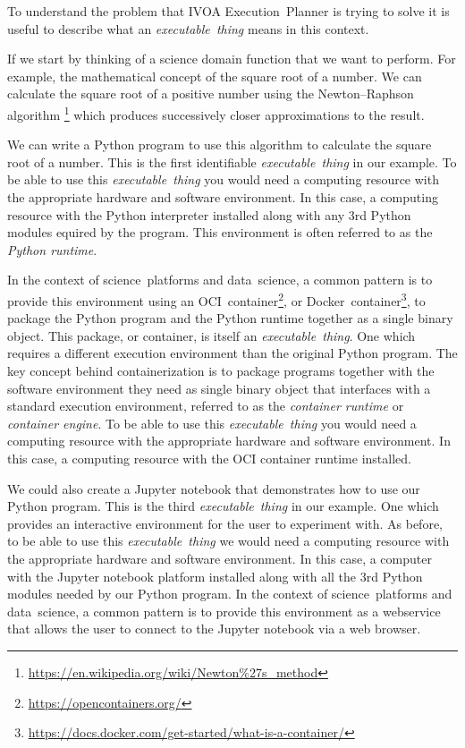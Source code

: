 \documentclass[11pt,a4paper]{ivoa}
\newcommand{\webservice} {webservice}
\newcommand{\webbrowser} {web browser}
\newcommand{\ivoa} {IVOA}
\newcommand{\executionplanner} {Execution~Planner}
\newcommand{\jupyter} {Jupyter}
\newcommand{\python} {Python}
\newcommand{\ocicontainer} {OCI~container}
\newcommand{\dockercontainer} {Docker~container}
\newcommand{\footurl}[1] {\footnote{\url{#1}}}
\newcommand{\datascience} {data~science}
\newcommand{\scienceplatform} {science~platform}
\newcommand{\executablething} {\textit{executable~thing}}
\begin{document}
To understand the problem that \ivoa{} \executionplanner{} is trying to solve
it is useful to describe what an \executablething{} means in this context.

If we start by thinking of a science domain function that we want to perform.
For example, the mathematical concept of the square root of a number.
We can calculate the square root of a positive number using the Newton–Raphson algorithm
\footurl{https://en.wikipedia.org/wiki/Newton\%27s_method}
which produces successively closer approximations to the result.

We can write a \python{} program to use this algorithm to calculate the square root of a number.
This is the first identifiable \executablething{} in our example.
To be able to use this \executablething{} you would need a computing resource with the appropriate
hardware and software environment. In this case, a computing resource with the \python{} interpreter
installed along with any 3rd \python{} modules equired by the program.
This environment is often referred to as the \textit{\python{} runtime}.

In the context of \scienceplatform{}s and \datascience{}, a common pattern is to provide this environment
using an \ocicontainer{}\footurl{https://opencontainers.org/},
or \dockercontainer\footurl{https://docs.docker.com/get-started/what-is-a-container/},
to package the \python{} program and the \python{} runtime together as a single binary object.
This package, or container, is itself an \executablething{}. One which requires a different execution
environment than the original \python{} program.
The key concept behind containerization is to package programs together with the software environment
they need as single binary object that interfaces with a standard execution environment,
referred to as the \textit{container runtime} or \textit{container engine}.
To be able to use this \executablething{} you would need a computing resource with the appropriate
hardware and software environment. In this case, a computing resource with the OCI container runtime installed.

We could also create a \jupyter{} notebook that demonstrates how to use our \python{} program.
This is the third \executablething{} in our example.
One which provides an interactive environment for the user to experiment with.
As before, to be able to use this \executablething{} we would need a computing resource with
the appropriate hardware and software environment.
In this case, a computer with the \jupyter{} notebook platform installed along with all the 3rd \python{} modules
needed by our \python{} program.
In the context of \scienceplatform{}s and \datascience{}, a common pattern is to provide this environment as a \webservice{}
that allows the user to connect to the \jupyter{} notebook via a \webbrowser.
\end{document}
